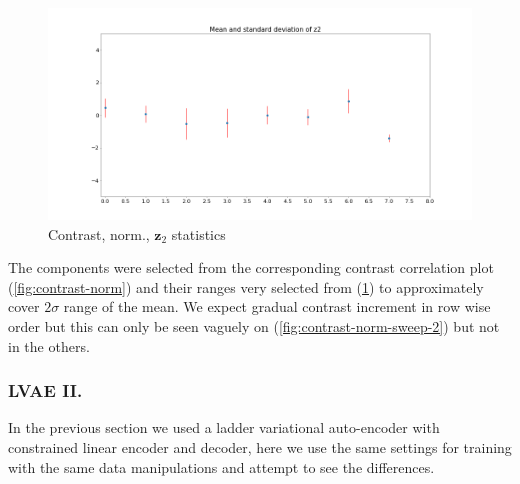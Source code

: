 \documentclass[12pt, english]{article}
\begin{document}
\begin{figure}[H]
    \centering
    \includegraphics[width=.85\linewidth]{sweep/norm_contrast_z2_stats.png} 
    \caption{Contrast, norm., $\bm{z}_2$ statistics} 
    \label{fig:contrast-norm-stats}
\end{figure}

\vspace{4mm}

\par The components were selected from the corresponding contrast correlation plot (\ref{fig:contrast-norm}) and their ranges very selected from (\ref{fig:contrast-norm-stats}) to approximately cover $2\sigma$ range of the mean. We expect gradual contrast increment in row wise order but this can only be seen vaguely on (\ref{fig:contrast-norm-sweep-2}) but not in the others.

\vspace{4mm}

\subsubsection{LVAE II.}

\vspace{4mm}

\par In the previous section we used a ladder variational auto-encoder with constrained linear encoder and decoder, here we use the same settings for training with the same data manipulations and attempt to see the differences.

\vspace{4mm}
\end{document}
